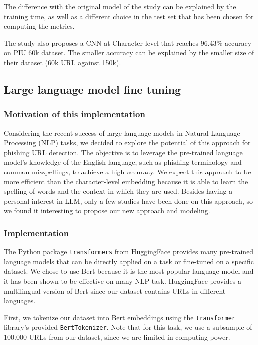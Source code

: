 \documentclass{article}
\begin{document}
    The difference with the original model of the study can be explained by the training time, as well as a different choice in the test set that has been chosen for computing the metrics.

    The study\cite{PhishingLoginURLDetection} also proposes a CNN at Character level that reaches 96.43\% accuracy on PIU 60k dataset.
    The smaller accuracy can be explained by the smaller size of their dataset (60k URL against 150k).

    \subsection{Large language model fine tuning}\label{subsec:large-language-model-finetuning}

    \subsubsection{Motivation of this implementation}

    Considering the recent success of large language models in Natural Language Processing (NLP) tasks, we decided to explore the potential of this approach for phishing URL detection.
    The objective is to leverage the pre-trained language model's knowledge of the English language, such as phishing terminology and common misspellings, to achieve a high accuracy.
    We expect this approach to be more efficient than the character-level embedding because it is able to learn the spelling of words and the context in which they are used.
    Besides having a personal interest in LLM, only a few studies have been done on this approach, so we found it interesting to propose our new approach and modeling.

    \subsubsection{Implementation}

    The Python package \texttt{transformers} from HuggingFace provides many pre-trained language models that can be directly applied on a task or fine-tuned on a specific dataset.
    We chose to use Bert because it is the most popular language model and it has been shown to be effective on many NLP task.
    HuggingFace provides a multilingual version of Bert since our dataset contains URLs in different languages.

    First, we tokenize our dataset into Bert embeddings using the \texttt{transformer} library's provided \texttt{BertTokenizer}.
    Note that for this task, we use a subsample of $100.000$ URLs from our dataset, since we are limited in computing power.
\end{document}
